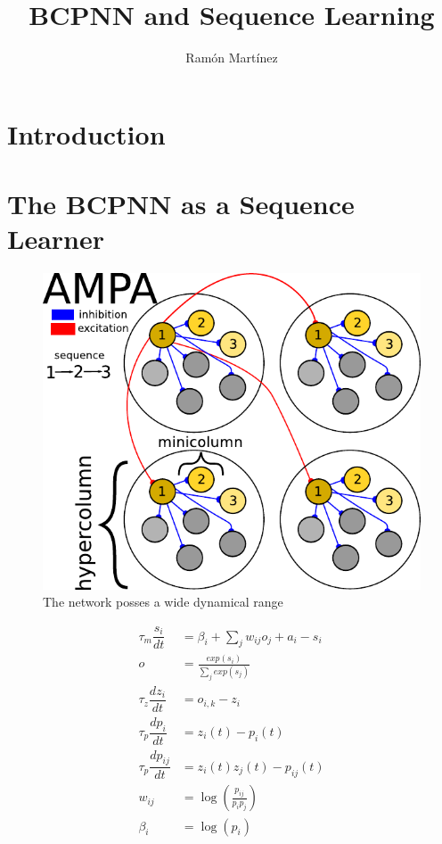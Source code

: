 \documentclass[10pt,a4paper]{article}
\author{Ram\'on Mart\'inez}
\title{BCPNN and Sequence Learning}
\begin{document}
\maketitle

\section{Introduction}

\cite{lashley1951problem}

\section{The BCPNN as a Sequence Learner}


\begin{figure}[h!]
\centering
\includegraphics[scale=0.50]{ampa2.pdf}
\caption{The network posses a wide dynamical range}
\end{figure}

\begin{align*}
\tau_m \dfrac{s_i}{dt} &= \beta_i + \sum_{j} w_{ij} o_j + a_i - s_i \\
o &= \frac{exp(s_i)}{\sum_j exp(s_j)} \\
\tau_z \dfrac{dz_i}{dt} &= o_{i, k} - z_{i} \\
\tau_p \dfrac{dp_i}{dt} &= z_i(t) - p_i(t)  \\  
\tau_p \dfrac{dp_{ij}}{dt} &= z_i(t) z_j(t) - p_{ij}(t)\\
w_{ij} &= \log(\frac{p_{ij}}{p_i p_j}) \\
\beta_i &= \log(p_i) 
\end{align*}






\end{document}
